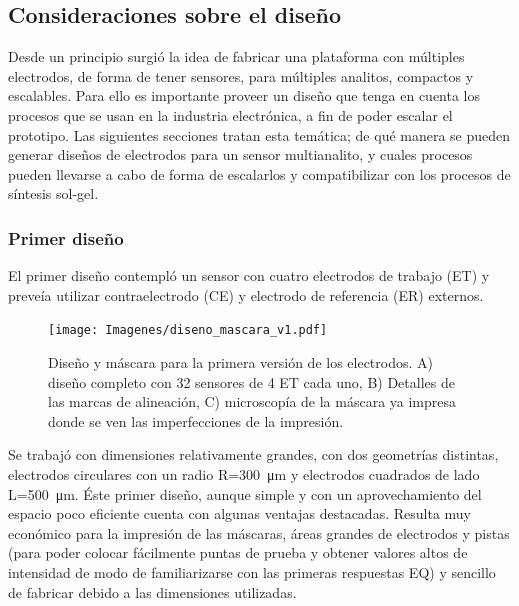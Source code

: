   		\subsection{Consideraciones sobre el diseño}\label{sec:diseno}

			 Desde un principio surgió la idea de fabricar una plataforma con múltiples electrodos, de forma de tener sensores, para múltiples analitos, compactos y escalables. Para ello es importante proveer un diseño que tenga en cuenta los procesos que se usan en la industria electrónica, a fin de poder escalar el prototipo. Las siguientes secciones tratan esta temática; de qué manera se pueden generar diseños de electrodos para un sensor multianalito, y cuales procesos pueden llevarse a cabo de forma de escalarlos y compatibilizar con los procesos de síntesis sol-gel.

		 \subsubsection{Primer diseño}

		     El primer diseño contempló un sensor con cuatro electrodos de trabajo (ET) y preveía utilizar contraelectrodo (CE) y electrodo de referencia (ER) externos. 

		    	\begin{figure}[th!]
		 	       	\texttt{[image: Imagenes/diseno\_mascara\_v1.pdf]}
 		       		\caption[Primer diseño y máscara de los sensores]{Diseño y máscara para la primera versión de los electrodos. A) diseño completo con 32 sensores de 4 ET cada uno, B) Detalles de las marcas de alineación, C) microscopía de la máscara ya impresa donde se ven las imperfecciones de la impresión.}
 		         	\label{fig:diseno_mascara_v1}
 		     		\end{figure}
 		 	 \pagebreak
 		     		
		      Se trabajó con dimensiones relativamente grandes, con dos geometrías distintas, electrodos circulares con un radio R=\SI{300}{\um} y electrodos cuadrados de lado L=\SI{500}{\um}. Éste primer diseño, aunque simple y con un aprovechamiento del espacio poco eficiente cuenta con algunas ventajas destacadas. Resulta muy económico para la impresión de las máscaras, áreas grandes de electrodos y pistas (para poder colocar fácilmente puntas de prueba y obtener valores altos de intensidad de modo de familiarizarse con las primeras respuestas EQ) y sencillo de fabricar debido a las dimensiones utilizadas.
		
